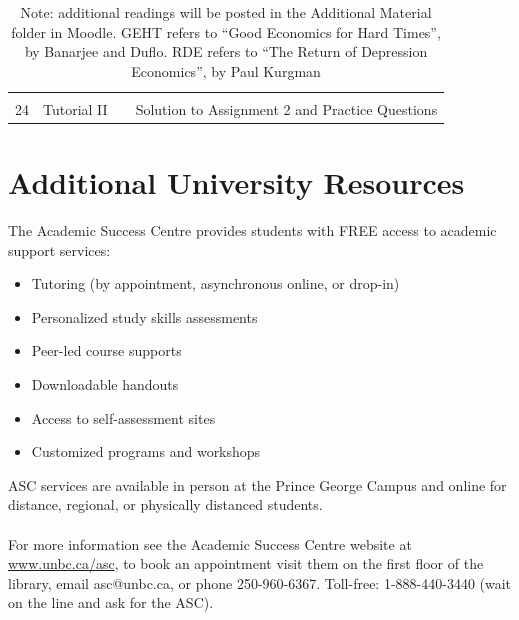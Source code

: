 \documentclass[letterpaper,12pt]{article}
\theoremstyle{dotlessS}
\begin{document}
\begin{table}[!h]
\begin{minipage}[h]{1\textwidth}
{\begin{tabular}{|c|c|c|c|}
\hline
						&									&                                                  &                                                          \\
24                                &   Tutorial II                                       &                                              & Solution to Assignment 2 and Practice Questions                    \\[1.4ex]
\hline
\end{tabular}}
\end{minipage}
\captionsetup{width=0.99\textwidth}  
\caption*{Note: additional readings will be posted in the Additional Material folder in Moodle. GEHT refers to ``Good Economics for Hard Times'', by Banarjee and Duflo. RDE refers to ``The Return of Depression Economics'', by Paul Kurgman}
\end{table}	


\newpage

\section{Additional University Resources}

The Academic Success Centre provides students with FREE access to academic support services: 
\begin{itemize}
\item Tutoring (by appointment, asynchronous online, or drop-in)
\item Personalized study skills assessments 
\item Peer-led course supports 
\item Downloadable handouts 
\item Access to self-assessment sites 
\item Customized programs and workshops
\end{itemize}
ASC services are available in person at the Prince George Campus and online for distance, regional, or physically distanced students. \\
\\
For more information see the Academic Success Centre website at \url{www.unbc.ca/asc}, to book an appointment visit them on the first floor of the library, email asc@unbc.ca, or phone 250-960-6367. Toll-free: 1-888-440-3440 (wait on the line and ask for the ASC).
\end{document}
